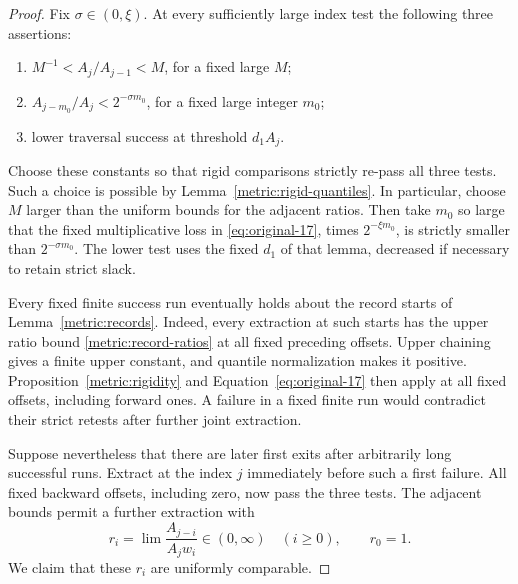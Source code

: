 \begin{proof}
Fix $\sigma\in(0,\xi)$. At every sufficiently large index test the
following three assertions:
\begin{enumerate}
\item $M^{-1}<A_j/A_{j-1}<M$, for a fixed large $M$;
\item $A_{j-m_0}/A_j<2^{-\sigma m_0}$, for a fixed large integer $m_0$;
\item lower traversal success at threshold $d_1A_j$.
\end{enumerate}
Choose these constants so that rigid comparisons strictly re-pass all
three tests. Such a choice is possible by
Lemma~\ref{metric:rigid-quantiles}. In particular, choose $M$ larger
than the uniform bounds for the adjacent ratios. Then take $m_0$ so
large that the fixed multiplicative loss in
\eqref{eq:original-17}, times $2^{-\xi m_0}$, is strictly smaller
than $2^{-\sigma m_0}$. The lower test uses the fixed $d_1$ of that
lemma, decreased if necessary to retain strict slack.

Every fixed finite success run eventually holds about the record starts
of Lemma~\ref{metric:records}. Indeed, every extraction at such starts
has the upper ratio bound \eqref{metric:record-ratios} at all fixed
preceding offsets. Upper chaining gives a finite upper constant, and
quantile normalization makes it positive. Proposition~\ref{metric:rigidity}
and Equation~\eqref{eq:original-17} then apply at all fixed offsets,
including forward ones. A failure in a fixed finite run would contradict
their strict retests after further joint extraction.

Suppose nevertheless that there are later first exits after arbitrarily
long successful runs. Extract at the index $j$ immediately before such
a first failure. All fixed backward offsets, including zero, now pass
the three tests. The adjacent bounds permit a further extraction with
\begin{equation}\label{metric:ratio-sequence}
 r_i=\lim\frac{A_{j-i}}{A_jw_i}\in(0,\infty)
 \quad(i\ge0),\qquad r_0=1.
\end{equation}
We claim that these $r_i$ are uniformly comparable.


\end{proof}
